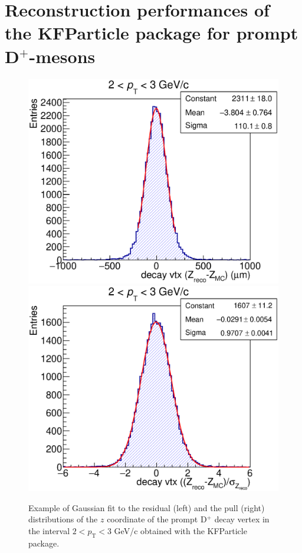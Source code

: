\documentclass[b5paper,10pt,twoside,oldstyle,classica]{toptesi}
\newcommand{\pt}{p_\text{T}}
\begin{document}
\section{Reconstruction performances of the KFParticle package for prompt D$^+$-mesons}
\begin{figure}[b]
\begin{center}
{\includegraphics[scale = 0.28]{ResExKF.eps}}
\hspace{0.cm}
{\includegraphics[scale = 0.28]{PullExKF.eps}}
\caption{Example of Gaussian fit to the residual (left) and the pull (right) distributions of the $z$ coordinate of the prompt D$^+$ decay vertex in the interval $2<\pt <3$ GeV/c obtained with the KFParticle package.}
\label{KF_respull}
\end{center}
\end{figure} 
\end{document}
